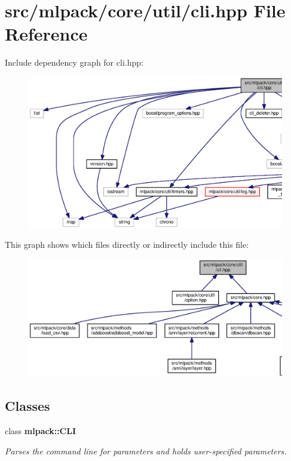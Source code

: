 \section{src/mlpack/core/util/cli.hpp File Reference}
\label{cli_8hpp}
Include dependency graph for cli.\+hpp\+:
\nopagebreak
\begin{figure}[H]
\begin{center}
\leavevmode
\includegraphics[width=350pt]{cli_8hpp__incl}
\end{center}
\end{figure}
This graph shows which files directly or indirectly include this file\+:
\nopagebreak
\begin{figure}[H]
\begin{center}
\leavevmode
\includegraphics[width=350pt]{cli_8hpp__dep__incl}
\end{center}
\end{figure}
\subsection*{Classes}
\begin{DoxyCompactItemize}
\item 
class {\bf mlpack\+::\+C\+LI}
\begin{DoxyCompactList}\small\item\em Parses the command line for parameters and holds user-\/specified parameters. \end{DoxyCompactList}\end{DoxyCompactItemize}
